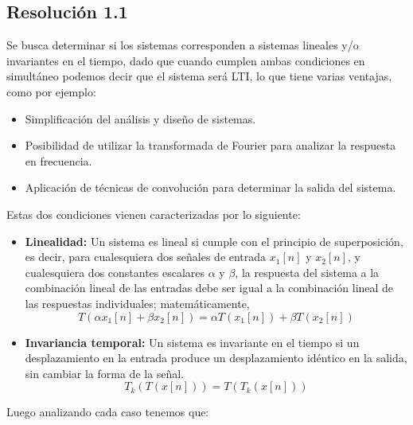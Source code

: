 \documentclass[
  11pt,
  letterpaper,
   addpoints,
  ]{exam}
\begin{document}
\begin{questions}
\begin{solution}
  \subsection*{Resolución 1.1}
Se busca determinar si los sistemas corresponden a sistemas lineales y/o invariantes en el tiempo, dado que cuando cumplen ambas condiciones en simultáneo podemos decir que el sistema será LTI, lo que tiene varias ventajas, como por ejemplo:
\begin{itemize}
  \item Simplificación del análisis y diseño de sistemas.
  \item Posibilidad de utilizar la transformada de Fourier para analizar la respuesta en frecuencia.
  \item Aplicación de técnicas de convolución para determinar la salida del sistema.
\end{itemize}
Estas dos condiciones vienen caracterizadas por lo siguiente:
\begin{itemize}
  \item \textbf{Linealidad:} Un sistema es lineal si cumple con el principio de superposición, es decir, para cualesquiera dos señales de entrada \(x_1[n]\) y \(x_2[n]\), y cualesquiera dos constantes escalares \(\alpha\) y \(\beta\), la respuesta del sistema a la combinación lineal de las entradas debe ser igual a la combinación lineal de las respuestas individuales; matemáticamente,
  \begin{equation}
    T(\alpha x_1[n] + \beta x_2[n]) = \alpha T(x_1[n]) + \beta T(x_2[n])
  \end{equation}
  \item \textbf{Invariancia temporal:} Un sistema es invariante en el tiempo si un desplazamiento en la entrada produce un desplazamiento idéntico en la salida, sin cambiar la forma de la señal.
  \begin{equation}
    T_k(T(x[n])) = T(T_k(x[n]))
  \end{equation}
\end{itemize}
Luego analizando cada caso tenemos que:


\end{solution}
\end{questions}
\end{document}
